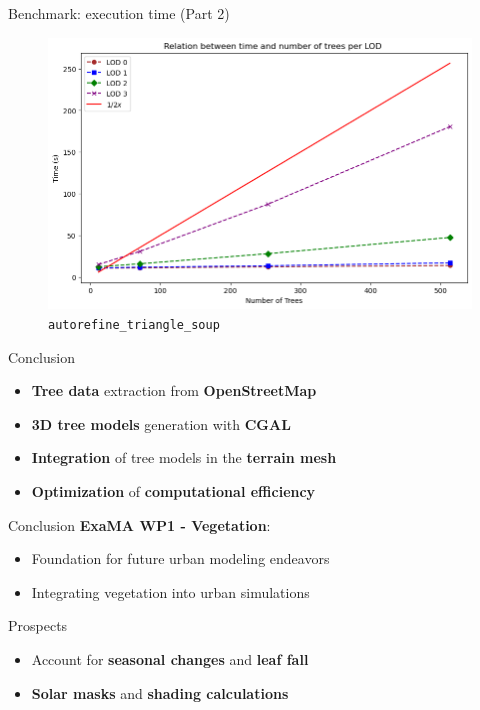 \documentclass[10pt]{beamer}
\begin{document}
\begin{frame}{Benchmark: execution time (Part 2)}
  \Large
  \begin{figure}[H]
    \centering
    \includegraphics[width=1\textwidth]{images/bench_time_ntree_linear.png}
    \caption{\texttt{autorefine\_triangle\_soup}}
  \end{figure}
\end{frame}

\begin{frame}{Conclusion}
  \Large
  \begin{itemize}
    \item \textbf{Tree data} extraction from \textbf{OpenStreetMap}
    \item \textbf{3D tree models} generation with \textbf{CGAL}
    \item \textbf{Integration} of tree models in the \textbf{terrain mesh}
    \item \textbf{Optimization} of \textbf{computational efficiency}
  \end{itemize}
\end{frame}

\begin{frame}{Conclusion}
  \Large
  \textbf{ExaMA WP1 - Vegetation}:
  \begin{itemize}
    \item Foundation for future urban modeling endeavors
    \item Integrating vegetation into urban simulations
  \end{itemize}
\end{frame}

\begin{frame}{Prospects}
  \Large
  \begin{itemize}
    \item Account for \textbf{seasonal changes} and \textbf{leaf fall}
    \item \textbf{Solar masks} and \textbf{shading calculations}
  \end{itemize}
\end{frame}
\end{document}
